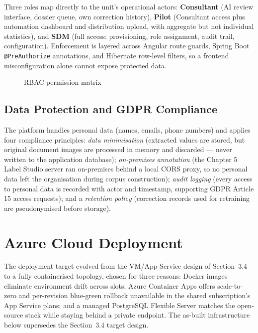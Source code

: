 Three roles map directly to the unit's operational actors: \textbf{Consultant} (AI review interface, dossier queue, own correction history), \textbf{Pilot} (Consultant access plus automation dashboard and distribution upload, with aggregate but not individual statistics), and \textbf{SDM} (full access: provisioning, role assignment, audit trail, configuration). Enforcement is layered across Angular route guards, Spring Boot \texttt{@PreAuthorize} annotations, and Hibernate row-level filters, so a frontend misconfiguration alone cannot expose protected data.

\begin{figure}[H]
  \centering
  \caption{RBAC permission matrix}
  \label{fig:rbac-matrix}
\end{figure}

\subsection{Data Protection and GDPR Compliance}

The platform handles personal data (names, emails, phone numbers) and applies four compliance principles: \emph{data minimisation} (extracted values are stored, but original document images are processed in memory and discarded — never written to the application database); \emph{on-premises annotation} (the Chapter 5 Label Studio server ran on-premises behind a local CORS proxy, so no personal data left the organisation during corpus construction); \emph{audit logging} (every access to personal data is recorded with actor and timestamp, supporting GDPR Article 15 access requests); and a \emph{retention policy} (correction records used for retraining are pseudonymised before storage).

\bigskip

\section{Azure Cloud Deployment}

The deployment target evolved from the VM/App-Service design of Section~3.4 to a fully containerised topology, chosen for three reasons: Docker images eliminate environment drift across slots; Azure Container Apps offers scale-to-zero and per-revision blue-green rollback unavailable in the shared subscription's App Service plans; and a managed PostgreSQL Flexible Server matches the open-source stack while staying behind a private endpoint. The as-built infrastructure below supersedes the Section~3.4 target design.

